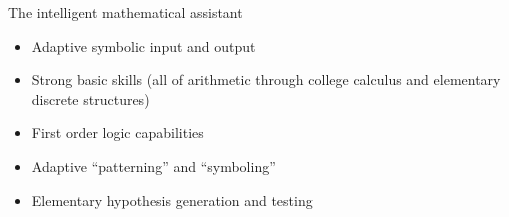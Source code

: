 \documentclass{slides}
\begin{document}
\begin{slide}{}

{\large The intelligent mathematical assistant }

\begin{itemize}
	\item Adaptive symbolic input and output
	\item Strong basic skills (all of arithmetic \newline
		through college calculus and \newline
		elementary discrete structures)
	\item First order logic capabilities
	\item Adaptive ``patterning'' and ``symboling''
	\item Elementary hypothesis generation \newline
		and testing
\end{itemize}
\end{slide}
%
\end{document}
